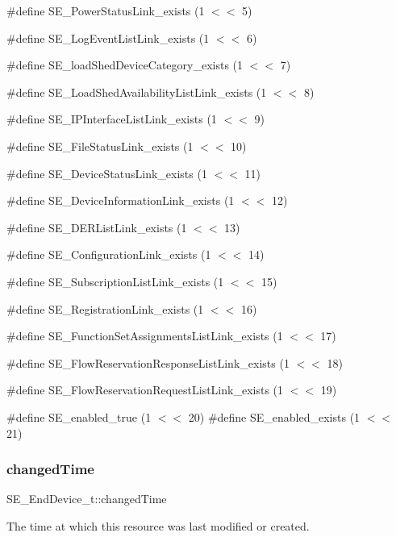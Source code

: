 \#define S\+E\+\_\+\+Power\+Status\+Link\+\_\+exists (1 $<$$<$ 5)

\#define S\+E\+\_\+\+Log\+Event\+List\+Link\+\_\+exists (1 $<$$<$ 6)

\#define S\+E\+\_\+load\+Shed\+Device\+Category\+\_\+exists (1 $<$$<$ 7)

\#define S\+E\+\_\+\+Load\+Shed\+Availability\+List\+Link\+\_\+exists (1 $<$$<$ 8)

\#define S\+E\+\_\+\+I\+P\+Interface\+List\+Link\+\_\+exists (1 $<$$<$ 9)

\#define S\+E\+\_\+\+File\+Status\+Link\+\_\+exists (1 $<$$<$ 10)

\#define S\+E\+\_\+\+Device\+Status\+Link\+\_\+exists (1 $<$$<$ 11)

\#define S\+E\+\_\+\+Device\+Information\+Link\+\_\+exists (1 $<$$<$ 12)

\#define S\+E\+\_\+\+D\+E\+R\+List\+Link\+\_\+exists (1 $<$$<$ 13)

\#define S\+E\+\_\+\+Configuration\+Link\+\_\+exists (1 $<$$<$ 14)

\#define S\+E\+\_\+\+Subscription\+List\+Link\+\_\+exists (1 $<$$<$ 15)

\#define S\+E\+\_\+\+Registration\+Link\+\_\+exists (1 $<$$<$ 16)

\#define S\+E\+\_\+\+Function\+Set\+Assignments\+List\+Link\+\_\+exists (1 $<$$<$ 17)

\#define S\+E\+\_\+\+Flow\+Reservation\+Response\+List\+Link\+\_\+exists (1 $<$$<$ 18)

\#define S\+E\+\_\+\+Flow\+Reservation\+Request\+List\+Link\+\_\+exists (1 $<$$<$ 19)

\#define S\+E\+\_\+enabled\+\_\+true (1 $<$$<$ 20) \#define S\+E\+\_\+enabled\+\_\+exists (1 $<$$<$ 21) \mbox{\label{group__EndDevice_ga909dabe84c9c37177ec7a63776c0170f}} 
\subsubsection{\texorpdfstring{changed\+Time}{changedTime}}
{\footnotesize\ttfamily S\+E\+\_\+\+End\+Device\+\_\+t\+::changed\+Time}

The time at which this resource was last modified or created. \mbox{\label{group__EndDevice_ga268aeabad7fb9b0e83e5e354dd06f37f}} 
